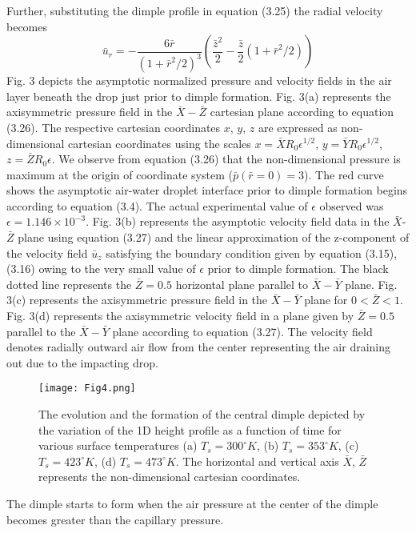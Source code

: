 \documentclass{jfm}
\begin{document}
Further, substituting the dimple profile in equation (3.25) the radial velocity becomes
\begin{equation}
     {\bar{u}}_r = -\frac{6\bar{r}}{{(1+{\bar{r}}^2/2)}^{3}} \left(\frac{{\bar{z}}^2}{2} - \frac{\bar{z}}{2}{(1+{\bar{r}}^2/2)}\right)
\end{equation}
Fig. 3 depicts the asymptotic normalized pressure and velocity fields in the air layer beneath the drop just prior to dimple formation. Fig. 3(a) represents the axisymmetric pressure field in the $\bar{X}-\bar{Z}$ cartesian plane according to equation (3.26). The respective cartesian coordinates $x$, $y$, $z$ are expressed as non-dimensional cartesian coordinates using the scales ${x}=\bar{X}R_0{\epsilon}^{1/2}$, ${y}=\bar{Y}R_0{\epsilon}^{1/2}$, $z=\bar{Z}R_0{\epsilon}$. We observe from equation (3.26) that the non-dimensional pressure is maximum at the origin of coordinate system ($\bar{p}(\bar{r}=0)=3$).
The red curve shows the asymptotic air-water droplet interface prior to dimple formation begins according to equation (3.4). 
The actual experimental value of ${\epsilon}$ observed was ${\epsilon}=1.146{\times}10^{-3}$.
Fig. 3(b) represents the asymptotic velocity field data in the $\bar{X}$-$\bar{Z}$ plane using equation (3.27) and the linear approximation of the z-component of the velocity field $\bar{u}_z$ satisfying the boundary condition given by equation (3.15), (3.16) owing to the very small value of ${\epsilon}$ prior to dimple formation. The black dotted line represents the $\bar{Z}=0.5$ horizontal plane parallel to $\bar{X}-\bar{Y}$ plane. Fig. 3(c) represents the axisymmetric pressure field in the $\bar{X}-\bar{Y}$ plane for $0<\bar{Z}<1$. Fig. 3(d) represents the axisymmetric velocity field in a plane given by $\bar{Z}=0.5$ parallel to the $\bar{X}-\bar{Y}$ plane according to equation (3.27). The velocity field denotes radially outward air flow from the center representing the air draining out due to the impacting drop.
\begin{figure*}
    \centering
    \texttt{[image: Fig4.png]}
    \caption{
    The evolution and the formation of the central dimple depicted by the variation of the 1D height profile as a function of time for various surface temperatures (a) $T_s=300^{\circ}K$, (b) $T_s=353^{\circ}K$, (c) $T_s=423^{\circ}K$, (d) $T_s=473^{\circ}K$. The horizontal and vertical axis $\bar{X}$, $\bar{Z}$ represents the non-dimensional cartesian coordinates.
    }
    \label{Figure4}
\end{figure*}
The dimple starts to form when the air pressure at the center of the dimple becomes greater than the capillary pressure.
\end{document}
